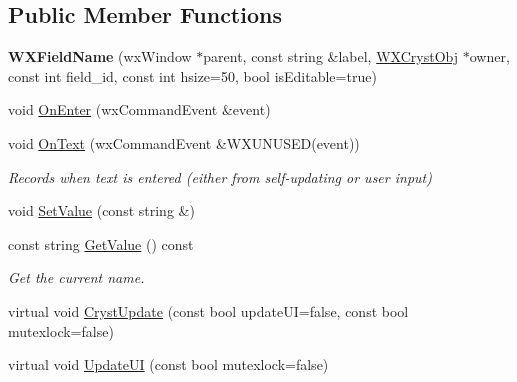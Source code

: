 \subsection*{Public Member Functions}
\begin{DoxyCompactItemize}
\item 
\mbox{\label{class_obj_cryst_1_1_w_x_field_name_a7d6ee70f302497016a1c7faaa3b65633}} 
{\bfseries W\+X\+Field\+Name} (wx\+Window $\ast$parent, const string \&label, \mbox{\hyperlink{class_obj_cryst_1_1_w_x_cryst_obj}{W\+X\+Cryst\+Obj}} $\ast$owner, const int field\+\_\+id, const int hsize=50, bool is\+Editable=true)
\item 
void \mbox{\hyperlink{class_obj_cryst_1_1_w_x_field_name_aedb19a5c1028d7956a42ccc3b6864481}{On\+Enter}} (wx\+Command\+Event \&event)
\item 
\mbox{\label{class_obj_cryst_1_1_w_x_field_name_adddf5bb83b5ccceed120466118a3a650}} 
void \mbox{\hyperlink{class_obj_cryst_1_1_w_x_field_name_adddf5bb83b5ccceed120466118a3a650}{On\+Text}} (wx\+Command\+Event \&W\+X\+U\+N\+U\+S\+ED(event))
\begin{DoxyCompactList}\small\item\em Records when text is entered (either from self-\/updating or user input) \end{DoxyCompactList}\item 
void \mbox{\hyperlink{class_obj_cryst_1_1_w_x_field_name_a31c2d4ae66874976d03fb3dc1f61e781}{Set\+Value}} (const string \&)
\item 
\mbox{\label{class_obj_cryst_1_1_w_x_field_name_af62c624824fefe1256618d448579bb37}} 
const string \mbox{\hyperlink{class_obj_cryst_1_1_w_x_field_name_af62c624824fefe1256618d448579bb37}{Get\+Value}} () const
\begin{DoxyCompactList}\small\item\em Get the current name. \end{DoxyCompactList}\item 
virtual void \mbox{\hyperlink{class_obj_cryst_1_1_w_x_field_name_a0c01579606255f9c6d9e6738df89ba3b}{Cryst\+Update}} (const bool update\+UI=false, const bool mutexlock=false)
\item 
virtual void \mbox{\hyperlink{class_obj_cryst_1_1_w_x_field_name_a7a11ccb98cf448f4e964ba5bb1082d68}{Update\+UI}} (const bool mutexlock=false)

\end{DoxyCompactItemize}
